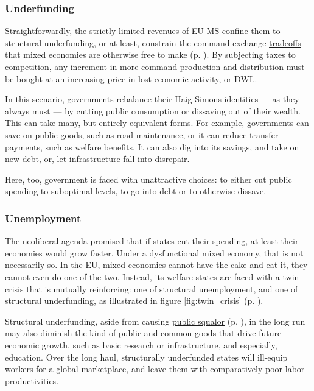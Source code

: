 \documentclass[11pt,a4paper,oneside,openright]{article}
\begin{document}
\subsubsection{Underfunding} \label{sec:public_squalor} Straightforwardly, the strictly limited revenues of \gls{EU} \gls{MS} confine them to structural underfunding, or at least, constrain the command-exchange \hyperref[sec:tradeoffs]{tradeoffs} that mixed economies are otherwise free to make (p. \pageref{sec:tradeoffs}). %
By subjecting taxes to competition, any increment in more command production and distribution must be bought at an increasing price in lost economic activity, or \gls{DWL}. 

In this scenario, governments rebalance their Haig-Simons identities --- as they always must --- by cutting public consumption or dissaving out of their wealth. 
This can take many, but entirely equivalent forms. 
For example, governments can save on public goods, such as road maintenance, or it can reduce transfer payments, such as welfare benefits. 
It can also dig into its savings, and take on new debt, or, let infrastructure fall into disrepair.

Here, too, government is faced with unattractive choices: 
to either cut public spending to suboptimal levels, to go into debt or to otherwise dissave.


\subsubsection{Unemployment}
The neoliberal agenda promised that if states cut their spending, at least their economies would grow faster. 
Under a dysfunctional mixed economy, that is not necessarily so. 
In the \gls{EU}, mixed economies cannot have the cake and eat it, they cannot even do one of the two. 
Instead, its welfare states are faced with a twin crisis that is mutually reinforcing: 
one of structural unemployment, and one of structural underfunding, as illustrated in figure \ref{fig:twin_crisis} (p. \pageref{fig:twin_crisis}). 

Structural underfunding, aside from causing \hyperref[sec:public_squalor]{public squalor} (p. \pageref{sec:public_squalor}), in the long run may also diminish the kind of public and common goods that drive future economic growth, such as basic research or infrastructure, and especially, education. 
Over the long haul, structurally underfunded states will ill-equip workers for a global marketplace, and leave them with comparatively poor labor productivities.
\end{document}
